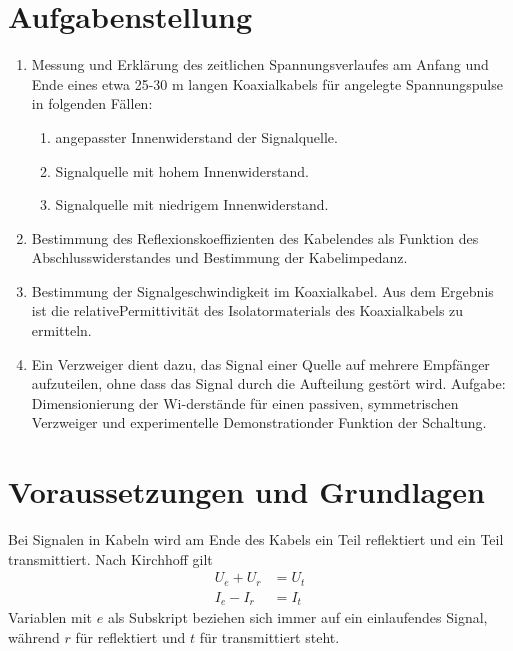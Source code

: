 \documentclass{article}
\begin{document}
\parindent0cm




\pagestyle{fancy}

\tableofcontents
\newpage
\section{Aufgabenstellung}

\begin{enumerate}
\item Messung und Erklärung des zeitlichen Spannungsverlaufes am Anfang und Ende eines etwa 25-30 m langen Koaxialkabels für angelegte Spannungspulse in folgenden Fällen:
\begin{enumerate}
\item angepasster Innenwiderstand der Signalquelle.
\item Signalquelle mit hohem Innenwiderstand.
\item Signalquelle mit niedrigem Innenwiderstand.
\end{enumerate}
\item Bestimmung des Reflexionskoeffizienten des Kabelendes als Funktion des Abschlusswiderstandes und Bestimmung der Kabelimpedanz.
\item Bestimmung der Signalgeschwindigkeit im Koaxialkabel. Aus dem Ergebnis ist die relativePermittivität des Isolatormaterials des Koaxialkabels zu ermitteln.
\item Ein Verzweiger dient dazu, das Signal einer Quelle auf mehrere Empfänger aufzuteilen, ohne dass das Signal durch die Aufteilung gestört wird. Aufgabe: Dimensionierung der Wi-derstände für einen passiven, symmetrischen Verzweiger und experimentelle Demonstrationder Funktion der Schaltung.
 
\end{enumerate}



\section{Voraussetzungen und Grundlagen}

Bei Signalen in Kabeln wird am Ende des Kabels ein Teil reflektiert und ein Teil transmittiert. Nach Kirchhoff gilt
\begin{align}
U_e + U_r &= U_t \\
I_e - I_r &= I_t
\end{align}
Variablen mit $e$ als Subskript beziehen sich immer auf ein einlaufendes Signal, während $r$ für reflektiert und $t$ für transmittiert steht.
\end{document}
